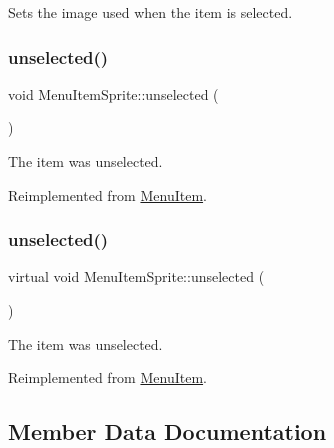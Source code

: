 Sets the image used when the item is selected. \mbox{\label{classMenuItemSprite_abdc49b1b264349807eae52aa96472abf}} 
\subsubsection{\texorpdfstring{unselected()}{unselected()}\hspace{0.1cm}{\footnotesize\ttfamily [1/2]}}
{\footnotesize\ttfamily void Menu\+Item\+Sprite\+::unselected (\begin{DoxyParamCaption}{ }\end{DoxyParamCaption})\hspace{0.3cm}{\ttfamily [virtual]}}

The item was unselected. 

Reimplemented from \hyperlink{classMenuItem_a3abeecc6d59ada50f4123e3e36ae4892}{Menu\+Item}.

\mbox{\label{classMenuItemSprite_a22671f2793757b6e4a528dd8bb393fe1}} 
\subsubsection{\texorpdfstring{unselected()}{unselected()}\hspace{0.1cm}{\footnotesize\ttfamily [2/2]}}
{\footnotesize\ttfamily virtual void Menu\+Item\+Sprite\+::unselected (\begin{DoxyParamCaption}{ }\end{DoxyParamCaption})\hspace{0.3cm}{\ttfamily [virtual]}}

The item was unselected. 

Reimplemented from \hyperlink{classMenuItem_a3abeecc6d59ada50f4123e3e36ae4892}{Menu\+Item}.



\subsection{Member Data Documentation}
\mbox{\label{classMenuItemSprite_a3a1b984ff13527e8292736194e13cd2e}} 

